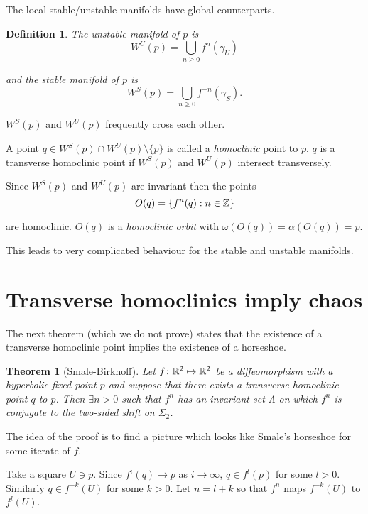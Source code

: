 \documentclass{notes}
\theoremstyle{plain}
\newtheorem{theorem}[proposition]{Theorem}
\newtheorem{definition}[proposition]{Definition}
\begin{document}
The local stable/unstable manifolds have global counterparts.

\begin{definition}
The unstable manifold of $p$ is
\[
W^U(p) = \bigcup_{n \ge 0} f^n(\gamma_U)
\]

and the stable manifold of $p$ is
\[
W^S(p) = \bigcup_{n \ge 0} f^{-n}(\gamma_S). 
\]
\end{definition}

$W^S(p)$ and $W^U(p)$ frequently cross each other.

\vspace{2in}

A point $q \in W^S(p) \cap W^U(p) \setminus \{ p \}$ is called a
\emph{homoclinic} point to $p$.  $q$ is a transverse homoclinic point
if $W^S(p)$ and $W^U(p)$ intersect transversely.

Since $W^S(p)$ and $W^U(p)$ are invariant then the points
\[
O(q) = \{ f^n(q) : n \in \mathbb{Z} \}
\]

are homoclinic.  $O(q)$ is a \emph{homoclinic orbit} with
$\omega(O(q)) = \alpha(O(q)) = p$.

This leads to very complicated behaviour for the stable and unstable
manifolds.

\vspace{1.5in}

\section{Transverse homoclinics imply chaos}

The next theorem (which we do not prove) states that the existence of
a transverse homoclinic point implies the existence of a horseshoe.

\begin{theorem}[Smale-Birkhoff]\label{thm:smale}
Let $f \colon \mathbb{R}^2 \mapsto \mathbb{R}^2$ be a diffeomorphism with a hyperbolic
fixed point $p$ and suppose that there exists a transverse homoclinic
point $q$ to $p$.  Then $\exists n > 0$ such that $f^n$ has an
invariant set $\Lambda$ on which $f^n$ is conjugate to the two-sided
shift on $\Sigma_2$.
\end{theorem}

The idea of the proof is to find a picture which looks like Smale's
horseshoe for some iterate of $f$.

\vspace{2in}

Take a square $U \ni p$.  Since $f^i(q) \to p$ as $i \to \infty$,
$q \in f^l(p)$ for some $l > 0$.  Similarly $q \in f^{-k}(U)$ for
some $k > 0$.  Let $n = l+k$ so that $f^n$ maps $f^{-k}(U)$ to $f^l(U)$.
\end{document}
